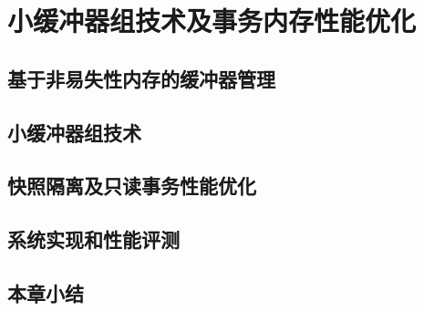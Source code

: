 \chapter{小缓冲器组技术及事务内存性能优化}
\label{chap:sba}

\section{基于非易失性内存的缓冲器管理}

\section{小缓冲器组技术}

\section{快照隔离及只读事务性能优化}

\section{系统实现和性能评测}

\section{本章小结}

